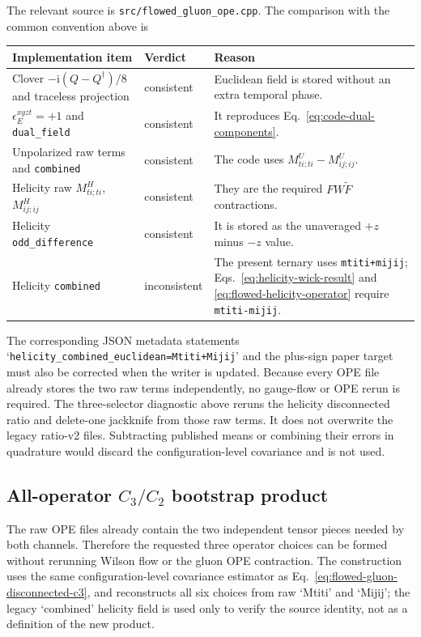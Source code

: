 \documentclass[11pt]{article}
\numberwithin{equation}{section}
\newcommand{\ii}{\mathrm{i}}
\begin{document}
The relevant source is \texttt{src/flowed\_gluon\_ope.cpp}.  The comparison
with the common convention above is
\begin{center}
\begin{tabular}{
  >{\raggedright\arraybackslash}p{}
  >{\raggedright\arraybackslash}p{}
  >{\raggedright\arraybackslash}p{}}
\toprule
Implementation item & Verdict & Reason \\
\midrule
Clover \(-\ii(Q-Q^\dagger)/8\) and traceless projection
 & consistent & Euclidean field is stored without an extra temporal phase.\\
\(\epsilon_E^{xyzt}=+1\) and \texttt{dual\_field}
 & consistent & It reproduces Eq.~\eqref{eq:code-dual-components}.\\
Unpolarized raw terms and \texttt{combined}
 & consistent & The code uses \(M_{ti;ti}^{U}-M_{ij;ij}^{U}\).\\
Helicity raw \(M_{ti;ti}^{H}\), \(M_{ij;ij}^{H}\)
 & consistent & They are the required \(F W\widetilde F\) contractions.\\
Helicity \texttt{odd\_difference}
 & consistent & It is stored as the unaveraged \(+z\) minus \(-z\) value.\\
Helicity \texttt{combined}
 & inconsistent & The present ternary uses
 \texttt{mtiti+mijij}; Eqs.~\eqref{eq:helicity-wick-result} and
 \eqref{eq:flowed-helicity-operator} require
 \texttt{mtiti-mijij}.\\
\bottomrule
\end{tabular}
\end{center}
The corresponding JSON metadata statements
`\texttt{helicity\_combined\_euclidean=Mtiti+Mijij}' and the plus-sign paper
target must also be corrected when the writer is updated.  Because every OPE
file already stores the two raw terms independently, no gauge-flow or OPE
rerun is required.  The three-selector diagnostic above reruns the helicity
disconnected ratio and delete-one jackknife from those raw terms.  It does
not overwrite the legacy ratio-v2 files.  Subtracting published means or
combining their errors in quadrature would discard the configuration-level
covariance and is not used.

\subsection{All-operator $C_3/C_2$ bootstrap product}
\label{sec:all-operator-c3c2}

The raw OPE files already contain the two independent tensor pieces needed by
both channels.  Therefore the requested three operator choices can be formed
without rerunning Wilson flow or the gluon OPE contraction.  The construction
uses the same configuration-level covariance estimator as
Eq.~\eqref{eq:flowed-gluon-disconnected-c3}, and reconstructs all six choices
from raw `Mtiti' and `Mijij'; the legacy `combined' helicity field is used only
to verify the source identity, not as a definition of the new product.
\end{document}
